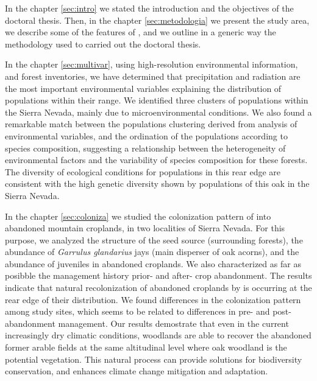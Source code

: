 In the \textcolor{ctcolormain}{chapter \ref{sec:intro}} we stated the introduction and the objectives of the doctoral thesis. Then, in the \textcolor{ctcolormain}{chapter \ref{sec:metodologia}} we present the study area, we describe some of the features of \Qp, and we outline in a generic way the methodology used to carried out the doctoral thesis. 

In the \textcolor{ctcolormain}{chapter \ref{sec:multivar}}, using high-resolution environmental information, and forest inventories, we have determined that precipitation and radiation are the most important environmental variables explaining the distribution of \Qp populations within their range. We identified three clusters of \Qp populations within the Sierra Nevada, mainly due to microenvironmental conditions. We also found a remarkable match between the populations clustering derived from analysis of environmental variables, and the ordination of the populations according to species composition, suggesting a relationship between the heterogeneity of environmental factors and the variability of species composition for these forests. The diversity of ecological conditions for \Qp populations in this rear edge are consistent with the high genetic diversity shown by populations of this oak in the Sierra Nevada. 

In the \textcolor{ctcolormain}{chapter \ref{sec:coloniza}} we studied the colonization pattern of \Qp into abandoned mountain croplands, in two localities of Sierra Nevada. For this purpose, we analyzed the structure of the seed source (surrounding forests), the abundance of \emph{Garrulus glandarius} jays (main disperser of oak acorns), and the abundance of \Qp juveniles in abandoned croplands. We also characterized as far as posibble the management history prior- and after- crop abandonment. The results indicate that natural recolonization of abandoned croplands by \Qp is occurring at the rear edge of their distribution. We found differences in the colonization pattern among study sites, which seems to be related to differences in pre- and post-abandonment management. Our results demostrate that even in the current increasingly dry climatic conditions, \Qp woodlands are able to recover the abandoned former arable fields at the same altitudinal level where oak woodland is the potential vegetation. This natural process can provide solutions for biodiversity conservation, and enhances climate change mitigation and adaptation. 

